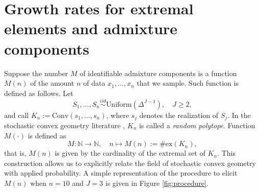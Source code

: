 \documentclass[12pt, reqno]{amsart}
\theoremstyle{definition}
\begin{document}
\section{Growth rates for extremal elements and admixture components}\label{mainresults}

Suppose the number $M$ of identifiable admixture components is a function $M(n)$ of the amount $n$ of data $x_1,\ldots,x_n$ that we sample. Such function is defined as follows. Let
\begin{equation}\label{eq1_fmm}
S_1,\ldots,S_n \stackrel{iid}{\sim} \mbox{Uniform}(\Delta^{J-1}), \quad J\geq 2,
\end{equation}
and call $K_n:=\text{Conv}(s_1,\ldots,s_n)$, where $s_j$ denotes the realization of $S_j$. In the stochastic convex geometry literature \cite{vu}, $K_n$ is called a \textit{random polytope}. Function $M(\cdot)$ is defined as
$$M:\mathbb{N} \rightarrow \mathbb{N}, \quad n \mapsto M(n):=\#\text{ex}(K_n),$$
that is, $M(n)$ is given by the cardinality of the extremal set of $K_n$. This construction allows us to explicitly relate the field of stochastic convex geometry with applied probability. A simple representation of the procedure to elicit $M(n)$ when $n=10$ and $J=3$ is given in Figure \ref{fig:procedure}.
\end{document}
